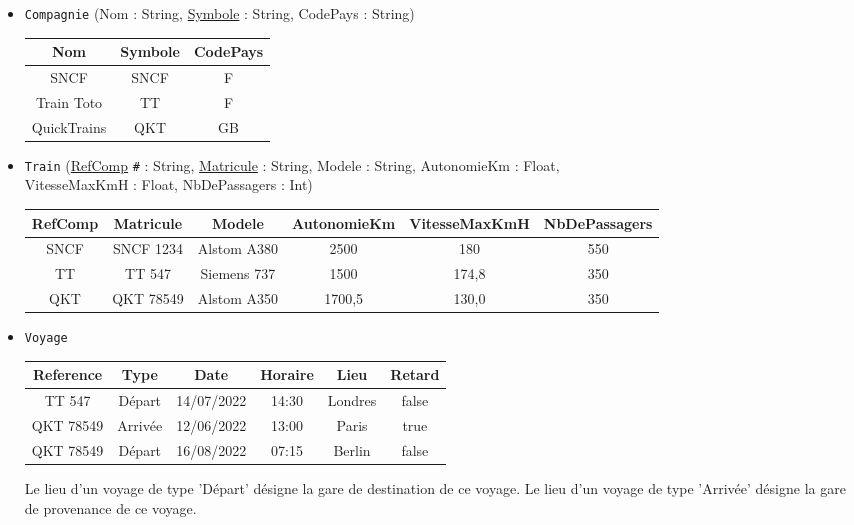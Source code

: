 \documentclass[11pt,a4paper,french,twoside]{PMCours}
\begin{document}
\begin{itemize}
\item \verb'Compagnie' (Nom : String, \underline{Symbole} : String, CodePays : String)
\begin{center}
\begin{tabular}{|c|c|c|}\hline
Nom & Symbole & CodePays\\\hline
SNCF & SNCF & F\\\hline
Train Toto & TT & F\\\hline
QuickTrains & QKT & GB\\\hline
\end{tabular}
\end{center}
\item \verb'Train' (\underline{RefComp} \verb'#' : String, \underline{Matricule} : String, Modele : String, AutonomieKm : Float, \\VitesseMaxKmH : Float, NbDePassagers : Int)
\begin{center}
\begin{tabular}{|c|c|c|c|c|c|}\hline
RefComp & Matricule & Modele & AutonomieKm & VitesseMaxKmH & NbDePassagers\\\hline
SNCF & SNCF 1234 & Alstom A380 & 2500 & 180 & 550\\\hline
TT & TT 547 & Siemens 737 & 1500 & 174,8 & 350\\\hline
QKT & QKT 78549 & Alstom A350 & 1700,5 & 130,0 & 350\\\hline
\end{tabular}
\end{center}
\newpage
\item \verb'Voyage'
\begin{center}
\begin{tabular}{|c|c|c|c|c|c|}\hline
Reference & Type & Date & Horaire & Lieu & Retard\\\hline
TT 547 & Départ & 14/07/2022 & 14:30 & Londres & false\\\hline
QKT 78549 & Arrivée & 12/06/2022 & 13:00 & Paris & true\\\hline
QKT 78549 & Départ & 16/08/2022 & 07:15 & Berlin & false\\\hline
\end{tabular}
\end{center}
Le lieu d'un voyage de type 'Départ' désigne la gare de destination de ce voyage. Le lieu d'un voyage de type 'Arrivée' désigne la gare de provenance de ce voyage. 

\end{itemize}
\end{document}
